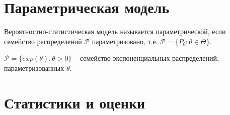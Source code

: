 \section{Параметрическая модель}
\begin{definition}
Вероятностно-статистическая модель называется параметрической, если семейство распределений $\displaystyle \mathcal{P}$ параметризовано, т.е. $\displaystyle \mathcal{P} =\{P_{\theta } :\theta \in \Theta \}$.
\end{definition}
\begin{example}
$\displaystyle \mathcal{P} =\{exp( \theta ) ,\theta  >0\}$ -- семейство экспоненциальных распределений, параметризованных $\displaystyle \theta $.
\end{example}
\section{Статистики и оценки}

